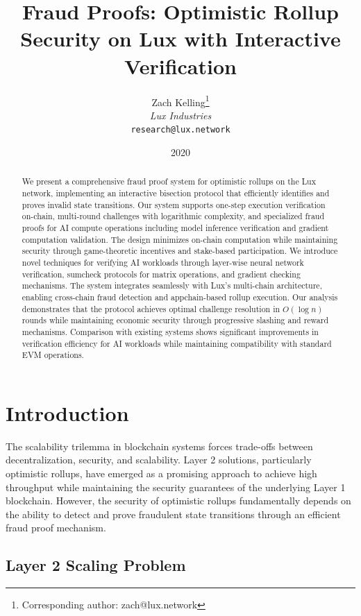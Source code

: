 \documentclass[11pt,a4paper]{article}
\title{Fraud Proofs: Optimistic Rollup Security on Lux with Interactive Verification}
\author{
Zach Kelling\thanks{Corresponding author: zach@lux.network}\\
\textit{Lux Industries}\\
\texttt{research@lux.network}
}
\date{2020}
\theoremstyle{definition}
\begin{document}
\luxcoverpage
\maketitle

\begin{abstract}
We present a comprehensive fraud proof system for optimistic rollups on the Lux network, implementing an interactive bisection protocol that efficiently identifies and proves invalid state transitions. Our system supports one-step execution verification on-chain, multi-round challenges with logarithmic complexity, and specialized fraud proofs for AI compute operations including model inference verification and gradient computation validation. The design minimizes on-chain computation while maintaining security through game-theoretic incentives and stake-based participation. We introduce novel techniques for verifying AI workloads through layer-wise neural network verification, sumcheck protocols for matrix operations, and gradient checking mechanisms. The system integrates seamlessly with Lux's multi-chain architecture, enabling cross-chain fraud detection and appchain-based rollup execution. Our analysis demonstrates that the protocol achieves optimal challenge resolution in $O(\log n)$ rounds while maintaining economic security through progressive slashing and reward mechanisms. Comparison with existing systems shows significant improvements in verification efficiency for AI workloads while maintaining compatibility with standard EVM operations.
\end{abstract}

\section{Introduction}

The scalability trilemma in blockchain systems forces trade-offs between decentralization, security, and scalability. Layer 2 solutions, particularly optimistic rollups, have emerged as a promising approach to achieve high throughput while maintaining the security guarantees of the underlying Layer 1 blockchain. However, the security of optimistic rollups fundamentally depends on the ability to detect and prove fraudulent state transitions through an efficient fraud proof mechanism.

\subsection{Layer 2 Scaling Problem}
\end{document}
